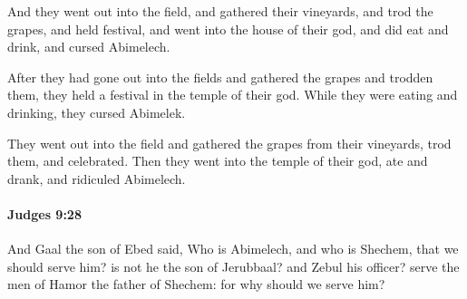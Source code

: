 			\begin{versebox}
					\item[BHS] 
					\item[ASV] And they went out into the field, and gathered their vineyards, and trod the grapes, and held festival, and went into the house of their god, and did eat and drink, and cursed Abimelech.
					\item[NIV] After they had gone out into the fields and gathered the grapes and trodden them, they held a festival in the temple of their god. While they were eating and drinking, they cursed Abimelek.
					\item[NRSV] They went out into the field and gathered the grapes from their vineyards, trod them, and celebrated. Then they went into the temple of their god, ate and drank, and ridiculed Abimelech.
			\end{versebox}

		\paragraph{Judges 9:28} %
			\label{JUDGES-9-28}

			And Gaal the son of Ebed said, Who is Abimelech, and who is Shechem, that we should serve him? is not he the son of Jerubbaal? and Zebul his officer? serve the men of Hamor the father of Shechem: for why should we serve him?

